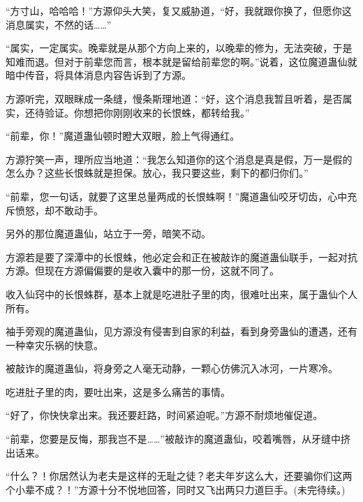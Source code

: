 \begin{this_body}
“方寸山，哈哈哈！”方源仰头大笑，复又威胁道，“好，我就跟你换了，但愿你这消息属实，不然的话……”

“属实，一定属实。晚辈就是从那个方向上来的，以晚辈的修为，无法突破，于是知难而退。但对于前辈您而言，根本就是留给前辈您的啊。”说着，这位魔道蛊仙就暗中传音，将具体消息内容告诉到了方源。

方源听完，双眼眯成一条缝，慢条斯理地道：“好，这个消息我暂且听着，是否属实，还待验证。你想把你刚刚收来的长恨蛛，都转给我。”

“前辈，你！”魔道蛊仙顿时瞪大双眼，脸上气得通红。

方源狞笑一声，理所应当地道：“我怎么知道你的这个消息是真是假，万一是假的怎么办？这些长恨蛛就是担保。放心，我只要这些，剩下的都归你们。”

“前辈，您一句话，就要了这里总量两成的长恨蛛啊！”魔道蛊仙咬牙切齿，心中充斥愤怒，却不敢动手。

另外的那位魔道蛊仙，站立于一旁，暗笑不动。

方源若是要了深潭中的长恨蛛，他必定会和正在被敲诈的魔道蛊仙联手，一起对抗方源。但现在方源偏偏要的是收入囊中的那一份，这就不同了。

收入仙窍中的长恨蛛群，基本上就是吃进肚子里的肉，很难吐出来，属于蛊仙个人所有。

袖手旁观的魔道蛊仙，见方源没有侵害到自家的利益，看到身旁蛊仙的遭遇，还有一种幸灾乐祸的快意。

被敲诈的魔道蛊仙，将身旁之人毫无动静，一颗心仿佛沉入冰河，一片寒冷。

吃进肚子里的肉，要吐出来，这是多么痛苦的事情。

“好了，你快快拿出来。我还要赶路，时间紧迫呢。”方源不耐烦地催促道。

“前辈，您要是反悔，那我岂不是……”被敲诈的魔道蛊仙，咬着嘴唇，从牙缝中挤出话来。

“什么？！你居然认为老夫是这样的无耻之徒？老夫年岁这么大，还要骗你们这两个小辈不成？！”方源十分不悦地回答，同时又飞出两只力道巨手。(未完待续。)

\end{this_body}

